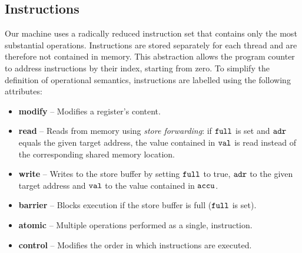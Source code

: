 

\subsection*{Instructions}

Our machine uses a radically reduced instruction set that contains only the most substantial operations.
Instructions are stored separately for each thread and are therefore not contained in memory.
This abstraction allows the program counter to address instructions by their index, starting from zero.
To simplify the definition of operational semantics, instructions are labelled using the following attributes:

\begin{itemize}
  \item \textbf{modify} -- Modifies a register's content.
  \item \textbf{read} -- Reads from memory using \emph{store forwarding}: if $\texttt{full}$ is set and $\texttt{adr}$ equals the given target address, the value contained in $\texttt{val}$ is read instead of the corresponding shared memory location.
  \item \textbf{write} -- Writes to the store buffer by setting $\texttt{full}$ to true, $\texttt{adr}$ to the given target address and $\texttt{val}$ to the value contained in $\texttt{accu}$.
  \item \textbf{barrier} -- Blocks execution if the store buffer is full ($\texttt{full}$ is set). %
  \item \textbf{atomic} -- Multiple operations performed as a single,  instruction.%
  \item \textbf{control} -- Modifies the order in which instructions are executed.
\end{itemize}

